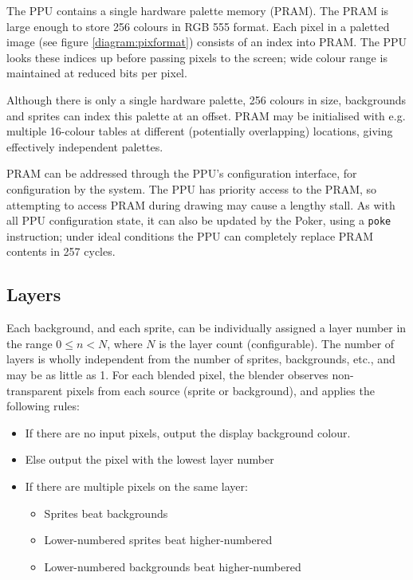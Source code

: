 \documentclass[notitlepage]{article}
\begin{document}
The PPU contains a single hardware palette memory (PRAM). The PRAM is large enough to store 256 colours in RGB 555 format. Each pixel in a paletted image (see figure \ref{diagram:pixformat}) consists of an index into PRAM. The PPU looks these indices up before passing pixels to the screen; wide colour range is maintained at reduced bits per pixel.

Although there is only a single hardware palette, 256 colours in size, backgrounds and sprites can index this palette at an offset. PRAM may be initialised with e.g. multiple 16-colour tables at different (potentially overlapping) locations, giving effectively independent palettes.

PRAM can be addressed through the PPU's configuration interface, for configuration by the system. The PPU has priority access to the PRAM, so attempting to access PRAM during drawing may cause a lengthy stall. As with all PPU configuration state, it can also be updated by the Poker, using a {\tt poke} instruction; under ideal conditions the PPU can completely replace PRAM contents in 257 cycles.

\subsection{Layers}

Each background, and each sprite, can be individually assigned a layer number in the range $0 \leq n < N$, where $N$ is the layer count (configurable). The number of layers is wholly independent from the number of sprites, backgrounds, etc., and may be as little as 1. For each blended pixel, the blender observes non-transparent pixels from each source (sprite or background), and applies the following rules:

\begin{itemize}
	\item If there are no input pixels, output the display background colour.
	\item Else output the pixel with the lowest layer number
	\item If there are multiple pixels on the same layer:
	\begin{itemize}
		\item Sprites beat backgrounds
		\item Lower-numbered sprites beat higher-numbered
		\item Lower-numbered backgrounds beat higher-numbered
	\end{itemize}
\end{itemize}
\end{document}
